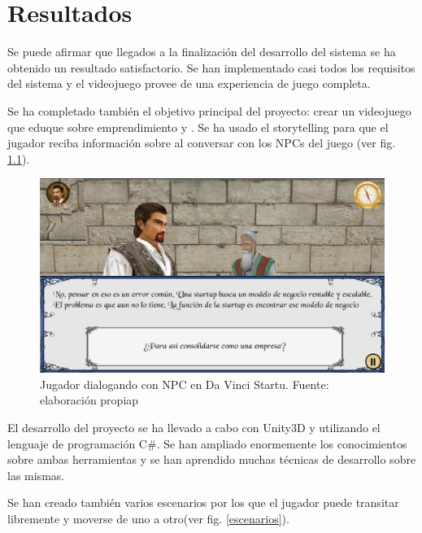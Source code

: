\chapter{Resultados}

Se  puede afirmar que llegados a la finalización del desarrollo del sistema se ha obtenido un resultado satisfactorio. Se han implementado casi todos los requisitos del sistema y el videojuego provee de una experiencia de juego completa.

Se ha completado también el objetivo principal del proyecto: crear un videojuego que eduque sobre emprendimiento y . Se ha usado el storytelling para que el jugador reciba información sobre  al conversar con los NPCs del juego (ver fig. \ref{dialogo}).

\begin{figure}
\begin{center}
\includegraphics[scale=0.5]{imagenes/dialogo.png}
\caption{Jugador dialogando con NPC en Da Vinci Startu.  Fuente: elaboración propiap}
\label{dialogo}
\end{center}
\end{figure}

El desarrollo del proyecto se ha llevado a cabo con Unity3D y utilizando el lenguaje de programación C\#. Se han ampliado enormemente los conocimientos sobre ambas herramientas y se han aprendido muchas técnicas de desarrollo sobre las mismas.

Se han creado también varios  escenarios por los que el jugador puede transitar libremente y moverse de uno a otro(ver fig. \ref{escenarios}).

